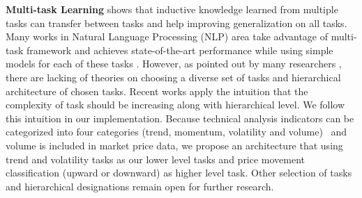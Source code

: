 \documentclass[sigconf,anonymous,review]{acmart}
\renewcommand{\citename}{\citet}
\renewcommand{\cite}{\citep}
\begin{document}
\textbf{Multi-task Learning} \citename{caruana1993multitask}
shows that inductive knowledge learned from multiple tasks can
transfer between tasks and help improving generalization on all
tasks. Many works in Natural Language Processing (NLP) area take
advantage of multi-task framework and achieves state-of-the-art
performance while using simple models for each of these tasks
\cite{sogaard2016deep,hashimoto2016joint}. However, as pointed
out by many researchers
\cite{caruana1993multitask,ruder2017overview}, there are lacking
of theories on choosing a diverse set of tasks and hierarchical
architecture of chosen tasks. Recent works
\cite{sogaard2016deep,hashimoto2016joint} apply the intuition
that the complexity of task should be increasing along with
hierarchical level. We follow this intuition in our
implementation. Because technical analysis indicators can be
categorized into four categories (trend, momentum, volatility and
volume)~\cite{kirkpatrick2010technical} and volume is included in
market price data, we propose an architecture that using trend
and volatility tasks as our lower level tasks and price movement
classification (upward or downward) as higher level task. Other
selection of tasks and hierarchical designations remain open for
further research.




\end{document}
